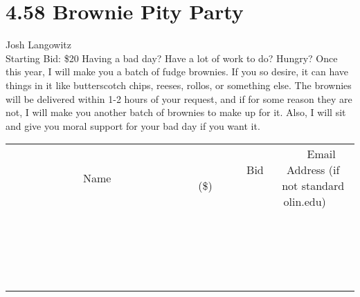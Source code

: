 \documentclass[11pt]{article}
\begin{document}
\section*{4.58 Brownie Pity Party}
Josh Langowitz
\\
Starting Bid: \$20
\newline
Having a bad day? Have a lot of work to do? Hungry? Once this year, I will make you a batch of fudge brownies. If you so desire, it can have things in it like butterscotch chips, reeses, rollos, or something else. The brownies will be delivered within 1-2 hours of your request, and if for some reason they are not, I will make you another batch of brownies to make up for it. Also, I will sit and give you moral support for your bad day if you want it.
\\[3ex]
\begin{tabular}{c c c}
~~~~~~~~~~~~~Name~~~~~~~~~~~~~ & ~~~~~~~~~Bid (\$)~~~~~~~~~  & ~~~Email Address (if not standard olin.edu)~~~\\
 & & \\
\hline
 & & \\
\hline
 & & \\
\hline
 & & \\
\hline
 & & \\
\hline
 & & \\
\hline
 & & \\
\hline
 & & \\
\hline
 & & \\
\hline
 & & \\
\hline
 & & \\
\hline
 & & \\
\hline
 & & \\
\hline
 & & \\
\hline
 & & \\
\hline
 & & \\
\hline
 & & \\
\hline
 & & \\
\hline
 & & \\
\hline
\end{tabular}
\newpage
\end{document}
